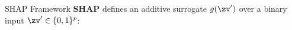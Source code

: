 \documentclass[10pt,compress,t,notes=noshow, xcolor=table]{beamer}
\begin{document}

\begin{framev}[align=top]{SHAP Framework }
\textbf{SHAP}
defines an additive surrogate $g(\zv')$ over a binary input $\zv' \in \{0,1\}^p$:





\end{framev}
\end{document}
